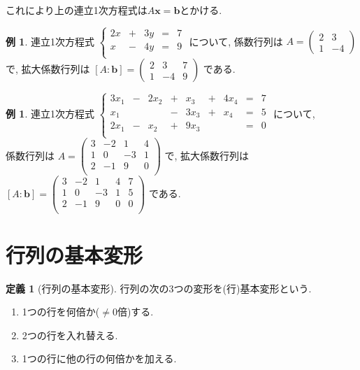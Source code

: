 \documentclass[dvipdfmx,a4paper,11pt]{article}
\theoremstyle{definition}
\newtheorem{dfn}[thm]{定義}
\newtheorem{exa}[thm]{例}
\begin{document}
 これにより上の連立1次方程式は$A\bm{x}=\bm{b}$とかける.

 \begin{exa}
 連立1次方程式
 $
 \left\{ 
\begin{matrix}
2x&+&3y& = &7 \\
x&-&4y& = &9 \\
\end{matrix}
\right.
 $
 について, 係数行列は
 $A = 
 \begin{pmatrix}
 2 & 3 \\
 1 & -4
 \end{pmatrix}
 $
 で, 拡大係数行列は
 $[A : \bm{b}] = 
  \begin{pmatrix}
 2 & 3  &7\\
 1 & -4 &9
 \end{pmatrix}
 $
 である.
 \end{exa}
 
  \begin{exa}
 連立1次方程式
 $
 \left\{ 
\begin{matrix}
3x_1&-&2x_2& +& x_3 &+& 4x_4 &=& 7 \\
x_1 &  & 	   & -& 3x_3 &+& x_4 &=& 5 \\
2x_1&-& x_2& +& 9x_3 & & 	 &=& 0 \\
\end{matrix}
\right.
 $
 について, \\
 係数行列は
 $A = 
 \begin{pmatrix}
 3 & -2  & 1&4\\
 1 & 0   & -3&1\\
2 & -1  & 9&0\\
 \end{pmatrix}
 $
 で, 拡大係数行列は
 $[A : \bm{b}] = 
 \begin{pmatrix}
 3 & -2  & 1&4 & 7\\
 1 & 0   & -3&1 &5\\
2 & -1  & 9&0 & 0\\
 \end{pmatrix}
 $
 である.
 \end{exa}
 
 \section{行列の基本変形}
  \begin{tcolorbox}[
    colback = white,
    colframe = green!35!black,
    fonttitle = \bfseries,
    breakable = true]
    \begin{dfn}[行列の基本変形]
 行列の次の3つの変形を(行)基本変形という.
 \begin{enumerate}
 \item 1つの行を何倍か($\neq 0$倍)する.
 \item 2つの行を入れ替える.
 \item1つの行に他の行の何倍かを加える.
 \end{enumerate}
  \end{dfn}
  
 \end{tcolorbox} 
\end{document}
